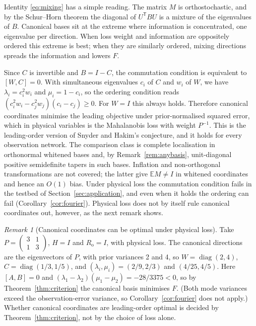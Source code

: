 \documentclass[11pt,a4paper]{article}
\numberwithin{equation}{section}
\theoremstyle{remark}\newtheorem{remark}[theorem]{Remark}
\newcommand{\E}{\mathbb E}
\newcommand{\diag}{\operatorname{diag}}
\newcommand{\T}{^{\mathsf T}}
\newcommand{\Rn}{R_{\mathrm o}}
\begin{document}
Identity \eqref{eq:mixing} has a simple reading. The matrix \(M\) is orthostochastic, and by the
Schur--Horn theorem the diagonal of \(U\T BU\) is a mixture of the eigenvalues of \(B\). Canonical
bases sit at the extreme where information is concentrated, one eigenvalue per direction. When
loss weight and information are oppositely ordered this extreme is best; when they are
similarly ordered, mixing directions spreads the information and lowers \(F\).

Since \(C\) is invertible and \(B=I-C\), the commutation condition is equivalent to
\([W,C]=0\). With simultaneous eigenvalues \(c_i\) of \(C\) and \(w_i\) of \(W\), we have
\(\lambda_i=c_i^2w_i\) and \(\mu_i=1-c_i\), so the ordering condition reads
\((c_i^2w_i-c_j^2w_j)(c_i-c_j)\ge0\). For \(W=I\) this always holds. Therefore canonical
coordinates minimise the leading objective under prior-normalised squared error, which in
physical variables is the Mahalanobis loss with weight \(P^{-1}\). This is the leading-order
version of Snyder and Hakim's conjecture, and it holds for every observation network. The
comparison class is complete localisation in orthonormal whitened bases and, by
Remark~\ref{rem:anybasis}, unit-diagonal positive semidefinite tapers in such bases. Inflation
and non-orthogonal transformations are not covered; the latter give \(\E M\ne I\) in whitened
coordinates and hence an \(O(1)\) bias. Under physical loss the commutation condition fails in
the testbed of Section~\ref{sec:application}, and even when it holds the ordering can fail
(Corollary~\ref{cor:fourier}). Physical loss does not by itself rule canonical coordinates out,
however, as the next remark shows.

\begin{remark}[Canonical coordinates can be optimal under physical loss]\label{rem:physok}
Take \(P=\left(\begin{smallmatrix}3&1\\1&3\end{smallmatrix}\right)\), \(H=I\) and \(\Rn=I\), with
physical loss. The canonical directions are the eigenvectors of \(P\), with prior variances 2 and
4, so \(W=\diag(2,4)\), \(C=\diag(1/3,1/5)\), and \((\lambda_i,\mu_i)=(2/9,2/3)\) and \((4/25,4/5)\).
Here \([A,B]=0\) and \((\lambda_1-\lambda_2)(\mu_1-\mu_2)=-28/3375<0\), so by
Theorem~\ref{thm:criterion} the canonical basis minimises \(F\). (Both mode variances exceed the
observation-error variance, so Corollary~\ref{cor:fourier} does not apply.) Whether canonical
coordinates are leading-order optimal is decided by Theorem~\ref{thm:criterion}, not by the
choice of loss alone.
\end{remark}
\end{document}
